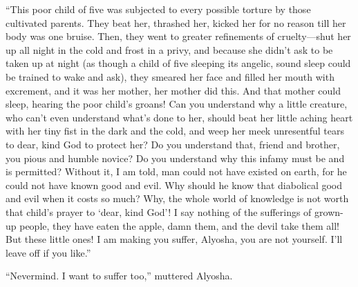 ``This poor child of five was subjected to every possible torture by
those cultivated parents. They beat her, thrashed her, kicked her for
no reason till her body was one bruise. Then, they went to greater
refinements of cru\-el\-ty---shut her up all night in the cold and
frost in a privy, and because she didn't ask to be taken up at night
(as though a child of five sleeping its angelic, sound sleep could be
trained to wake and ask), they smeared her face and filled her mouth
with excrement, and it was her mother, her mother did this. And that
mother could sleep, hearing the poor child's groans! Can you
understand why a little creature, who can't even understand what's
done to her, should beat her little aching heart with her tiny fist in
the dark and the cold, and weep her meek unresentful tears to dear,
kind God to protect her? Do you understand that, friend and brother,
you pious and humble novice? Do you understand why this infamy must be
and is permitted? Without it, I am told, man could not have existed on
earth, for he could not have known good and evil. Why should he know
that diabolical good and evil when it costs so much? Why, the whole
world of knowledge is not worth that child's prayer to `dear, kind
God'! I say nothing of the sufferings  of grown-up people,
they have eaten the apple, damn them, and the devil take them all! But
these little ones! I am making you suffer, Alyosha, you are not
yourself. I'll leave off if you like.''

``Nevermind. I want to suffer too,'' muttered Alyosha.

